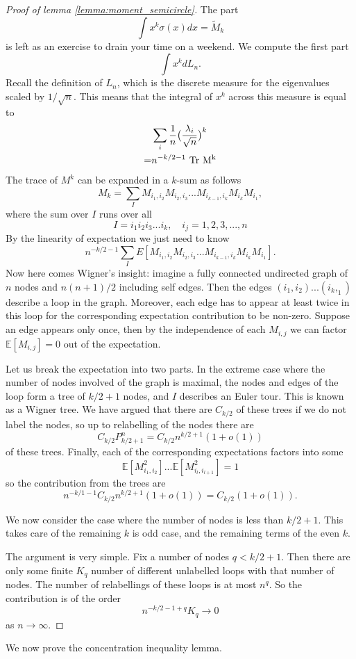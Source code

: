\begin{proof}[Proof of lemma \ref{lemma:moment_semicircle}]
    The part \[
    \int x^k \sigma(x) dx = \tilde{M}_k
    \]
    is left as an exercise to drain your time on a weekend.
    We compute the first part \[
    \int x^k dL_n.
    \]
    Recall the definition of $L_n$, which is the discrete measure for the eigenvalues scaled by $1/\sqrt{n}$. This means that the integral of $x^k$ across this measure is equal to \begin{align*}
        &\sum_i \frac{1}{n}\big(\frac{\lambda_i}{\sqrt{n}} \big) ^k\\
        = & n^{-k/2-1}\ \rm{Tr} \ M^k
    \end{align*} 
    The trace of $M^k$ can be expanded in a $k$-sum as follows \[
    M_k = \sum_{I} M_{i_1,i_2}M_{i_2,i_3}...M_{i_{k-1},i_k}M_{i_k}M_{i_1},
    \]
    where the sum over $I$ runs over all\[
    I=i_1i_2i_3...i_k,\quad i_j=1,2,3,...,n
    \]
    By the linearity of expectation we just need to know \[
    n^{-k/2-1} \sum_I E\left[M_{i_1,i_2}M_{i_2,i_3}...M_{i_{k-1},i_k}M_{i_k}M_{i_1}\right].
    \]
    Now here comes Wigner's insight: imagine a fully connected undirected graph of $n$ nodes and $n(n+1)/2$ including self edges. Then the edges $(i_1,i_2)...(i_k,_1)$ describe a loop in the graph. Moreover, each edge has to appear at least twice in this loop for the corresponding expectation contribution to be non-zero. Suppose an edge appears only once, then by the independence of each $M_{i,j}$ we can factor $\mathbb{E}[M_{i,j}]=0$ out of the expectation.

    Let us break the expectation into two parts. In the extreme case where the number of nodes involved of the graph is maximal, the nodes and edges of the loop form a tree of $k/2+1$ nodes, and $I$ describes an Euler tour. This is known as a Wigner tree. We have argued that there are $C_{k/2}$ of these trees if we do not label the nodes, so up to relabelling of the nodes there are \[
    C_{k/2}P^n_{k/2+1} = C_{k/2}n^{k/2+1}(1+o(1))
    \]
    of these trees. Finally, each of the corresponding expectations factors into some \[
    \mathbb{E}[M_{i_1,i_2}^2]...\mathbb{E}[M_{i_l,i_{l+1}}^2] = 1
    \]
    so the contribution from the trees are \[
     n^{-k/1-1} C_{k/2}n^{k/2+1}(1+o(1)) = C_{k/2}(1+o(1)).
    \]

    We now consider the case where the number of nodes is less than $k/2+1$. This takes care of the remaining $k$ is odd case, and the remaining terms of the even $k$.

    The argument is very simple. Fix a number of nodes $q<k/2+1$. Then there are only some finite $K_q$ number of different unlabelled loops with that number of nodes. The number of relabellings of these loops is at most $n^q$. So the contribution is of the order \[
    n^{-k/2-1+q}K_q \to 0
    \]as $n\to \infty$.
    
\end{proof}
We now prove the concentration inequality lemma.

